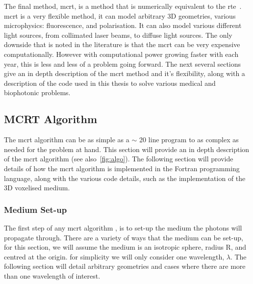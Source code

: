 \medskip

The final method, \gls{mcrt}, is a method that is numerically equivalent to the \gls{rte}~\cite{wang2012biomedical}. \Gls{mcrt} is a very flexible method, it can model arbitrary 3D geometries, various microphysics: fluorescence, and polarisation. It can also model various different light sources, from collimated laser beams, to diffuse light sources. The only downside that is noted in the literature is that the \gls{mcrt} can be very expensive computationally. However with computational power growing faster with each year, this is less and less of a problem going forward. The next several sections give an in depth description of the \gls{mcrt} method and it's flexibility, along with a description of the code used in this thesis to solve various medical and biophotonic problems.

\subsection{MCRT Algorithm}

The \gls{mcrt} algorithm can be as simple as a $\sim$ 20 line program to as complex as needed for the problem at hand. This section will provide an in depth description of the \gls{mcrt} algorithm (see also~\cref{fig:algo}). The following section will provide details of how the \gls{mcrt} algorithm is implemented in the Fortran programming language, along with the various code details, such as the implementation of the 3D voxelised medium.



%
%
%
%
%

\subsubsection{Medium Set-up}\label{sec:algomedium}
The first step of any \gls{mcrt} algorithm , is to set-up the medium the photons will propagate through. There are a variety of ways that the medium can be set-up, for this section, we will assume the medium is an isotropic sphere, radius R, and centred at the origin. for simplicity we will only consider one wavelength, $\lambda$. The following section will detail arbitrary geometries and cases where there are more than one wavelength of interest.



